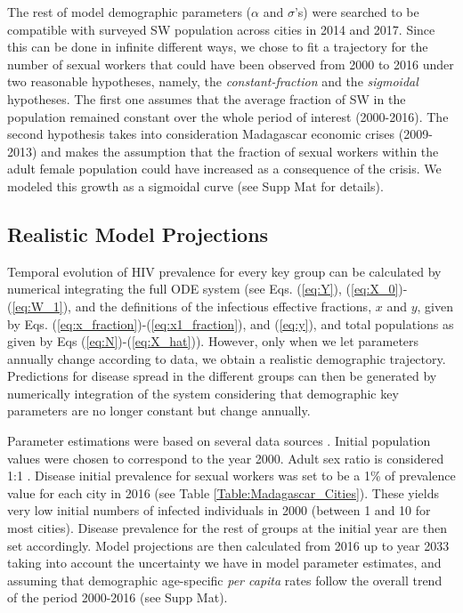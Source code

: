 \documentclass[preprint,12pt]{elsarticle}
\begin{document}
The rest of model demographic parameters ($\alpha$ and $\sigma$'s) were searched to be compatible with surveyed SW population across cities in 2014 and 2017. Since this can be done in infinite different ways, we chose to fit a trajectory for the number of sexual workers that could have been observed from 2000 to 2016 under two reasonable hypotheses, namely, the {\em constant-fraction} and the {\em sigmoidal} hypotheses. The first one assumes that the average fraction of SW in the population remained constant over the whole period of interest (2000-2016). The second hypothesis takes into consideration Madagascar economic crises (2009-2013) and makes the assumption that the fraction of sexual workers within the adult female population could have increased as a consequence of the crisis. We modeled this growth as a sigmoidal curve (see Supp Mat for details).  

\subsection{Realistic Model Projections}
Temporal evolution of HIV prevalence for every key group can be calculated by numerical integrating the full ODE system (see Eqs. (\ref{eq:Y}), (\ref{eq:X_0})-(\ref{eq:W_1}), and the definitions of the infectious effective fractions, $x$ and $y$, given by Eqs. (\ref{eq:x_fraction})-(\ref{eq:x1_fraction}), and (\ref{eq:y}),  and total populations as given by Eqs (\ref{eq:N})-(\ref{eq:X_hat})). However, only when we let parameters annually change according to data, we obtain a realistic demographic trajectory. Predictions for disease spread in the different groups can then be generated by numerically integration of the system considering that demographic key parameters are no longer constant but change annually. 
\smallskip

Parameter estimations were based on several data sources \cite{DataSourceCIA2018,DataSourceWHO2018,DataSourceInstat-Madagascar2018,DataSourceWM2019}. Initial population values were chosen to correspond to the year 2000. Adult sex ratio is considered 1:1 \cite{webSexRatio,DataSourceWHO2018}.  
Disease initial prevalence for sexual workers was set to be a 1\% of prevalence value for each city in 2016 (see Table \ref{Table:Madagascar_Cities}). These yields very low initial numbers of infected individuals in 2000 (between 1 and 10 for most cities). Disease prevalence for the rest of groups at the initial year are then set accordingly. Model projections are then calculated from 2016 up to year 2033 taking into account the uncertainty we have in model parameter estimates, and assuming that demographic age-specific {\em per capita} rates follow the overall trend of the period 2000-2016 (see Supp Mat). 
\end{document}
